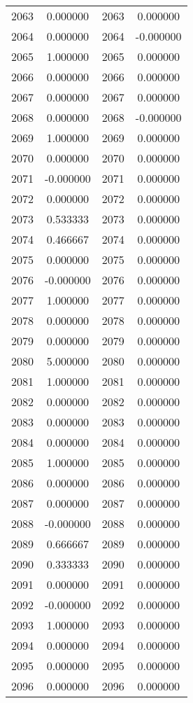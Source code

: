 \documentclass[12pt]{article}
\begin{document}
\begin{longtable}{@{}cccc@{}}
2063 & 0.000000 & 2063 & 0.000000 \\
2064 & 0.000000 & 2064 & -0.000000 \\
2065 & 1.000000 & 2065 & 0.000000 \\
2066 & 0.000000 & 2066 & 0.000000 \\
2067 & 0.000000 & 2067 & 0.000000 \\
2068 & 0.000000 & 2068 & -0.000000 \\
2069 & 1.000000 & 2069 & 0.000000 \\
2070 & 0.000000 & 2070 & 0.000000 \\
2071 & -0.000000 & 2071 & 0.000000 \\
2072 & 0.000000 & 2072 & 0.000000 \\
2073 & 0.533333 & 2073 & 0.000000 \\
2074 & 0.466667 & 2074 & 0.000000 \\
2075 & 0.000000 & 2075 & 0.000000 \\
2076 & -0.000000 & 2076 & 0.000000 \\
2077 & 1.000000 & 2077 & 0.000000 \\
2078 & 0.000000 & 2078 & 0.000000 \\
2079 & 0.000000 & 2079 & 0.000000 \\
2080 & 5.000000 & 2080 & 0.000000 \\
2081 & 1.000000 & 2081 & 0.000000 \\
2082 & 0.000000 & 2082 & 0.000000 \\
2083 & 0.000000 & 2083 & 0.000000 \\
2084 & 0.000000 & 2084 & 0.000000 \\
2085 & 1.000000 & 2085 & 0.000000 \\
2086 & 0.000000 & 2086 & 0.000000 \\
2087 & 0.000000 & 2087 & 0.000000 \\
2088 & -0.000000 & 2088 & 0.000000 \\
2089 & 0.666667 & 2089 & 0.000000 \\
2090 & 0.333333 & 2090 & 0.000000 \\
2091 & 0.000000 & 2091 & 0.000000 \\
2092 & -0.000000 & 2092 & 0.000000 \\
2093 & 1.000000 & 2093 & 0.000000 \\
2094 & 0.000000 & 2094 & 0.000000 \\
2095 & 0.000000 & 2095 & 0.000000 \\
2096 & 0.000000 & 2096 & 0.000000 \\

\end{longtable}
\end{document}

